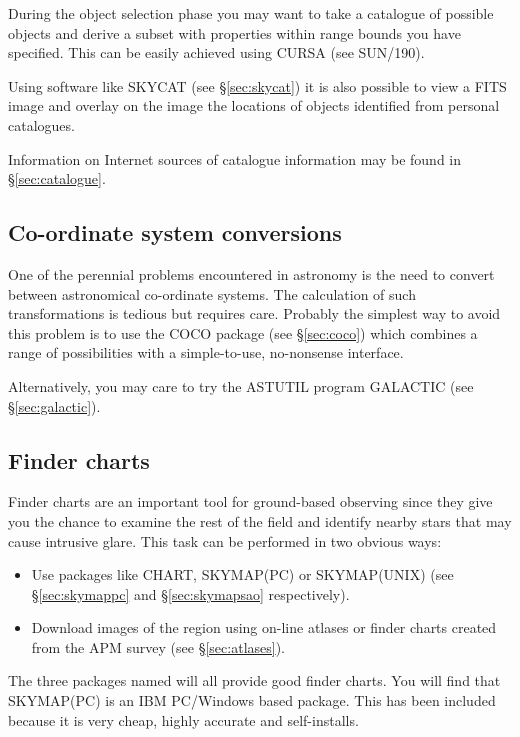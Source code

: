 \documentclass[twoside,11pt]{article}
\newcommand{\htmladdnormallink}[2]{#1}
\newcommand{\xref}[3]{#1}
\newcommand{\xlabel}[1]{}
\newcommand{\COCOref}{\xref{COCO}{sun56}{}}
\newcommand{\SKYMAPPCref}{\htmladdnormallink{SKYMAP(PC)}{http://www.skymap.com}}
\newcommand{\SKYMAPUNIXref}{\htmladdnormallink{SKYMAP(UNIX)}{http://tdc-www.harvard.edu/software/skymap.html}}
\newcommand{\CURSAref}{\xref{CURSA}{sun190}{}}
\newcommand{\CHARTref}{\xref{CHART}{sun32}{}}
\newcommand{\SKYCATref}{\htmladdnormallink{SKYCAT}{http://arch-http.hq.eso.org/skycat/}}
\newcommand{\APMref}{\htmladdnormallink{APM}{\tt http://www.ast.cam.ac.uk/\~{}rgm/apm_catalogues.html}}
\begin{document}
During the object selection phase you may want to take a catalogue of possible
objects and derive a subset with properties within range bounds you
have specified. This can be easily achieved using {\CURSAref} (see
SUN/190).

Using software like {\SKYCATref} (see \S{\ref{sec:skycat}}) 
it is also possible to view a FITS image 
and overlay on the image the locations of objects identified from personal 
catalogues.  

Information on Internet sources of catalogue information may be found in \S{\ref{sec:catalogue}}.

\subsection{Co-ordinate system conversions} \xlabel{CORDS}
\label{sec:cords}

One of the perennial problems encountered in astronomy is the need to convert 
between astronomical co-ordinate systems. The calculation of such transformations is tedious but
requires care. Probably the simplest way to avoid this problem is to use the 
{\COCOref} package (see \S{\ref{sec:coco}}) which combines 
a range of possibilities with a simple-to-use, no-nonsense interface.

Alternatively, you may care to try the ASTUTIL program GALACTIC (see \S{\ref{sec:galactic}}).


\subsection{Finder charts} \xlabel{FINDERC}
\label{sec:finderc}

Finder charts are an important tool for ground-based observing since
they give you the chance to examine the rest of the field and 
identify nearby stars that may cause intrusive glare. This task can be performed
in two obvious ways:

\begin{itemize}
\item Use packages like {\CHARTref}, 
{\SKYMAPPCref} or {\SKYMAPUNIXref} (see \S{\ref{sec:skymappc}} and \S{\ref{sec:skymapsao}} respectively).

\item Download images of the region using on-line atlases 
or finder charts created from the {\APMref} survey (see \S{\ref{sec:atlases}}). 
\end{itemize}

The three packages named will all provide good finder charts.
You will find that {\SKYMAPPCref} is an IBM PC/Windows based package.
This has been included because it is very cheap, highly accurate and 
self-installs. 
\end{document}
